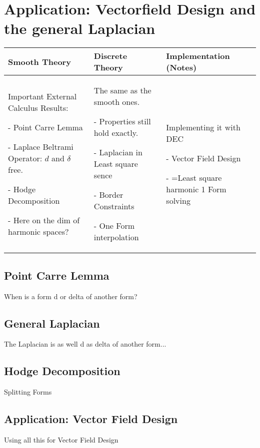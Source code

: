 \documentclass[draft]{scrbook}
\newenvironment{packed_enum}{
\begin{enumerate}
  \setlength{\itemsep}{1pt}
  \setlength{\parskip}{0pt}
  \setlength{\parsep}{0pt}
}{\end{enumerate}}
\begin{document}
\section{Application: Vectorfield Design and the general Laplacian}
	\begin{longtable}{|p{4.5cm}|p{4.5cm}|p{4.5cm}|}
		\hline
		Smooth Theory& Discrete Theory& Implementation (Notes)\\
		\hline
			Important External Calculus Results:
			\begin{packed_enum}
				\item[-] Point Carre Lemma
				\item[-] Laplace Beltrami Operator: $d$ and $\delta$ free.
				\item[-] Hodge Decomposition
				\item[-] Here on the dim of harmonic spaces?
			\end{packed_enum}
			&
			The same as the smooth ones.
			\begin{packed_enum}
				\item[-] Properties still hold exactly.
				\item[-] Laplacian in Least square sence
				\item[-] Border Constraints
				\item[-] One Form interpolation
			\end{packed_enum}
			 & 
			 Implementing it with DEC
			 \begin{packed_enum}
				\item[-] Vector Field Design
				\item[-] =Least square harmonic 1 Form solving
			\end{packed_enum}
			 \\		
		\hline
	\end{longtable}
	\subsection{Point Carre Lemma}
	When is a form d or delta of another form?
	\subsection{General Laplacian}
	The Laplacian is as well d as delta of another form...
	\subsection{Hodge Decomposition}
	Splitting Forms
	\subsection{Application: Vector Field Design}
	Using all this for Vector Field Design
\end{document}
